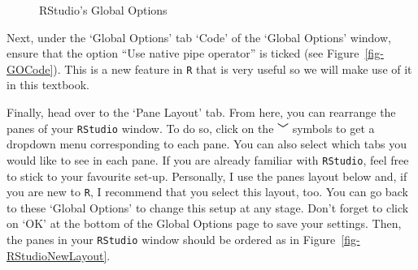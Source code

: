 \documentclass[
  letterpaper,
  DIV=11,
  numbers=noendperiod,
  oneside]{scrreprt}
\begin{document}
\begin{figure}
\begin{minipage}{0.50\linewidth}
{}


\end{minipage}%

\caption{\label{fig-GlobalOptions}RStudio's Global Options}

\end{figure}%

Next, under the `Global Options' tab `Code' of the `Global Options'
window, ensure that the option ``Use native pipe operator'' is ticked
(see Figure~\ref{fig-GOCode}). This is a new feature in \texttt{R} that
is very useful so we will make use of it in this textbook.

Finally, head over to the `Pane Layout' tab. From here, you can
rearrange the panes of your \texttt{RStudio} window. To do so, click on
the ﹀ symbols to get a dropdown menu corresponding to each pane. You
can also select which tabs you would like to see in each pane. If you
are already familiar with \texttt{RStudio}, feel free to stick to your
favourite set-up. Personally, I use the panes layout below and, if you
are new to \texttt{R}, I recommend that you select this layout, too. You
can go back to these `Global Options' to change this setup at any stage.
Don't forget to click on `OK' at the bottom of the Global Options page
to save your settings. Then, the panes in your \texttt{RStudio} window
should be ordered as in Figure~\ref{fig-RStudioNewLayout}.
\end{document}

